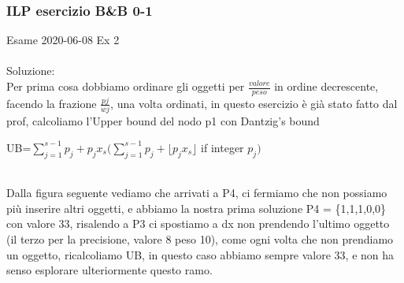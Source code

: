 \documentclass{article}
\begin{document}
\subsubsection{ILP esercizio B\&B 0-1}
Esame 2020-06-08 Ex 2\\
\noindent{}
\\
Soluzione:\\
Per prima cosa dobbiamo ordinare gli oggetti per $ \frac{valore}{peso} $ in ordine decrescente, facendo la frazione $ \frac{pj}{wj} $, una volta ordinati, in questo esercizio è già stato fatto dal prof, calcoliamo l'Upper bound del nodo p1 con Dantzig's bound\\
\begin{center}
UB=$ \displaystyle \sum_{j=1}^{s-1} p_j + p_jx_s (\displaystyle \sum_{j=1}^{s-1} p_j + \lfloor p_j x_s \rfloor$ if integer $p_j)  $
\end{center}
~\\
Dalla figura seguente vediamo che arrivati a P4, ci fermiamo che non possiamo più inserire altri oggetti, e abbiamo la nostra prima soluzione P4 = \{1,1,1,0,0\} con valore 33, risalendo a P3 ci spostiamo a dx non prendendo l'ultimo oggetto (il terzo per la precisione, valore 8 peso 10), come ogni volta che non prendiamo un oggetto, ricalcoliamo UB, in questo caso abbiamo sempre valore 33, e non ha senso esplorare ulteriormente questo ramo.\\
\end{document}

